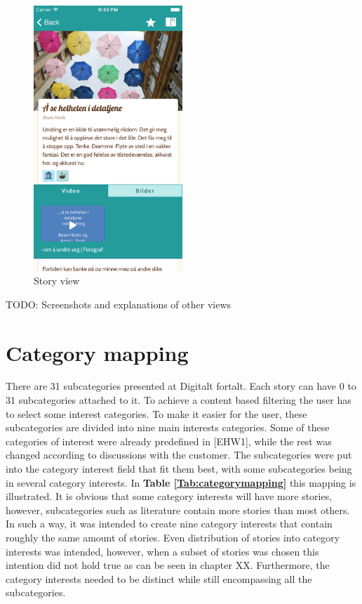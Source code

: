 \begin{figure}[h!]
	\centering
	\includegraphics[width=0.5\textwidth]{fig/story_view}
	\caption{Story view}
	\label{Fig:story_view}
\end{figure}

TODO: Screenshots and explanations of other views

\section{Category mapping} 
\label{sec:categorymapping}

There are 31 subcategories presented at Digitalt fortalt. Each story can have 0 to 31 subcategories attached to it. To achieve a content based filtering the user has to select some interest categories. To make it easier for the user, these subcategories are divided into nine main interests categories. Some of these categories of interest were already predefined in [EHW1], while the rest was changed according to discussions with the customer. The subcategories were put into the category interest field that fit them best, with some subcategories being in several category interests. In \textbf{Table \ref{Tab:categorymapping}} this mapping is illustrated. It is obvious that some category interests will have more stories, however, subcategories such as literature contain more stories than most others. In such a way, it was intended to create nine category interests that contain roughly the same amount of stories. Even distribution of stories into category interests was intended, however, when a subset of stories was chosen this intention did not hold true as can be seen in chapter XX. Furthermore, the category interests needed to be distinct while still encompassing all the subcategories. 

